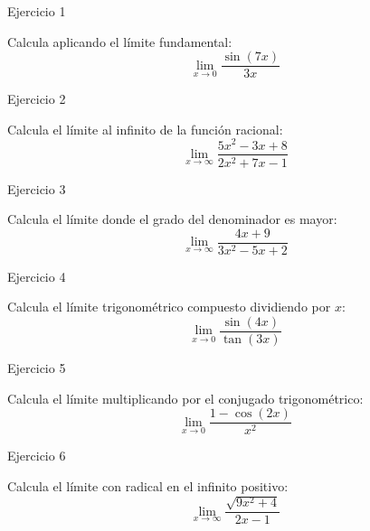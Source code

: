 \documentclass[aspectratio=169]{beamer}
\begin{document}
\begin{frame}{Ejercicio 1}
  \begin{mwejercicio}
    Calcula aplicando el límite fundamental:
    $$\lim_{x \to 0} \frac{\sin(7x)}{3x}$$
  \end{mwejercicio}
  \vspace{3.5cm}
\end{frame}
\begin{frame}{Ejercicio 2}
  \begin{mwejercicio}
    Calcula el límite al infinito de la función racional:
    $$\lim_{x \to \infty} \frac{5x^2 - 3x + 8}{2x^2 + 7x - 1}$$
  \end{mwejercicio}
  \vspace{3.5cm}
\end{frame}
\begin{frame}{Ejercicio 3}
  \begin{mwejercicio}
    Calcula el límite donde el grado del denominador es mayor:
    $$\lim_{x \to \infty} \frac{4x + 9}{3x^2 - 5x + 2}$$
  \end{mwejercicio}
  \vspace{3.5cm}
\end{frame}
\begin{frame}{Ejercicio 4}
  \begin{mwejercicio}
    Calcula el límite trigonométrico compuesto dividiendo por $x$:
    $$\lim_{x \to 0} \frac{\sin(4x)}{\tan(3x)}$$
  \end{mwejercicio}
  \vspace{3.5cm}
\end{frame}
\begin{frame}{Ejercicio 5}
  \begin{mwejercicio}
    Calcula el límite multiplicando por el conjugado trigonométrico:
    $$\lim_{x \to 0} \frac{1 - \cos(2x)}{x^2}$$
  \end{mwejercicio}
  \vspace{3.5cm}
\end{frame}
\begin{frame}{Ejercicio 6}
  \begin{mwejercicio}
    Calcula el límite con radical en el infinito positivo:
    $$\lim_{x \to \infty} \frac{\sqrt{9x^2 + 4}}{2x - 1}$$
  \end{mwejercicio}
  \vspace{3.5cm}
\end{frame}
\end{document}
